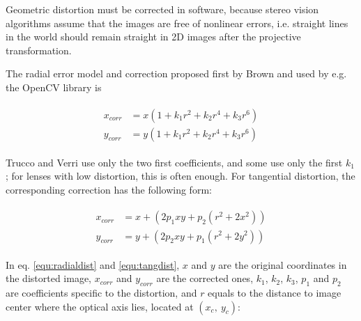 

Geometric distortion must be corrected in software, because stereo vision algorithms assume that the images are free of nonlinear errors, i.e. straight lines in the world should remain straight in 2D images after the projective transformation.

The radial error model and correction proposed first by Brown \cite{brown1966decentering} and used by e.g. the OpenCV library \cite{opencv} is %

\begin{align} \label{equ:radialdist} \begin{split}
	x_{corr} &= x(1 + k_1 r^2 + k_2 r^4 + k_3 r^6)\\
	y_{corr} &= y(1 + k_1 r^2 + k_2 r^4 + k_3 r^6)
\end{split} \end{align}


Trucco and Verri \cite{trucco1998introductory} use only the two first coefficients, and some use only the first $k_1$; for lenses with low distortion, this is often enough.
For tangential distortion, the corresponding correction has the following form:

\begin{align} \label{equ:tangdist} \begin{split}
x_{corr} &= x + (2 p_1 x y + p_2 (r^2 + 2 x^2))\\
y_{corr} &= y + (2 p_2 x y + p_1 (r^2 + 2 y^2))
\end{split} \end{align}

In eq. \ref{equ:radialdist} and \ref{equ:tangdist}, $x$ and $y$ are the original coordinates in the distorted image, $x_{corr}$ and $y_{corr}$ are the corrected ones, $k_1$, $k_2$, $k_3$, $p_1$ and $p_2$ are coefficients specific to the distortion, and $r$ equals to the distance to image center where the optical axis lies, located at $(x_c,~y_c)$:

